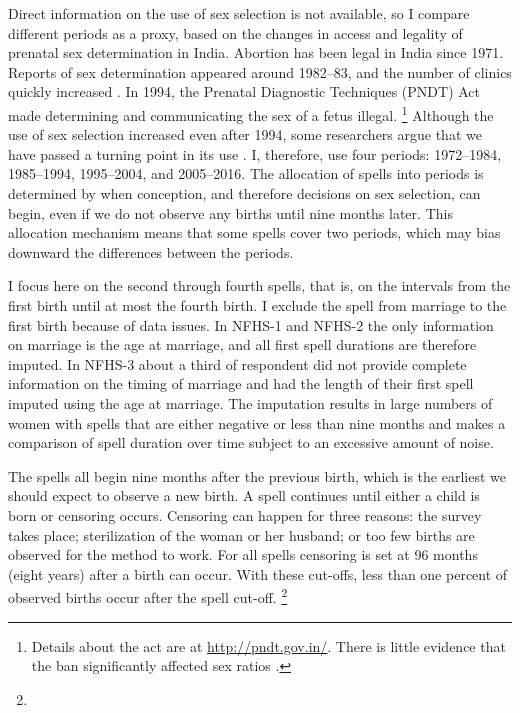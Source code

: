 \documentclass[12pt,letterpaper]{article}
\begin{document}
Direct information on the use of sex selection is not available, so I compare different 
periods as a proxy, based on the changes in access and legality of prenatal sex 
determination in India.
Abortion has been legal in India since 1971.
Reports of sex determination appeared around 1982--83, and the number of clinics 
quickly increased \citep{Sudha1999,bhat06,Grover2006}.
In 1994, the Prenatal Diagnostic Techniques (PNDT) Act made determining and communicating 
the sex of a fetus illegal.%
\footnote{
Details about the act are at \href{http://pndt.gov.in/}{http://pndt.gov.in/}.
There is little evidence that the ban significantly affected sex ratios \citep{Das-Gupta2016}.
}
Although the use of sex selection increased even after 1994, some researchers argue that 
we have passed a turning point in its use \citep{Das_Gupta2009,Diamond-Smith2015}.
I, therefore, use four periods: 1972--1984, 1985--1994, 1995--2004, and 2005--2016.
The allocation of spells into periods is determined by when conception, and therefore 
decisions on sex selection, can begin, even if we do not observe any births until nine 
months later. 
This allocation mechanism means that some spells cover two periods, which may bias 
downward the differences between the periods.

I focus here on the second through fourth spells, that is, on the intervals from the first 
birth until at most the fourth birth.
I exclude the spell from marriage to the first birth because of data issues.
In NFHS-1 and NFHS-2 the only information on marriage is the age at marriage, and 
all first spell durations are therefore imputed.
In NFHS-3 about a third of respondent did not provide complete information on the
timing of marriage and had the length of their first spell imputed using the age at 
marriage.
The imputation results in large numbers of women with spells that are either negative or 
less than nine months and makes a comparison of spell duration over time subject to an 
excessive amount of noise.

The spells all begin nine months after the previous birth, which is the earliest we should 
expect to observe a new birth.
A spell continues until either a child is born or censoring occurs.
Censoring can happen for three reasons:
the survey takes place;
sterilization of the woman or her husband;
or too few births are observed for the method to work.
For all spells censoring is set at 96 months (eight years) after a birth can occur.
With these cut-offs, less than one percent of observed births occur after
the spell cut-off.%
\footnote{

}
\end{document}
